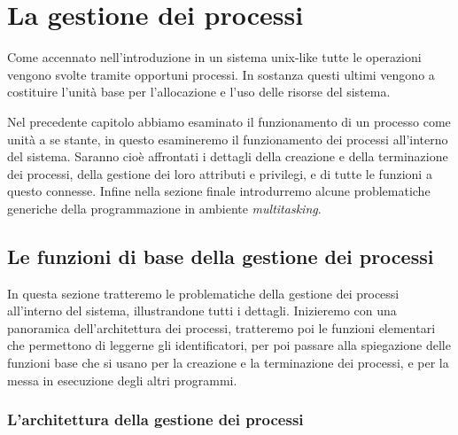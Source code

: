 
\chapter{La gestione dei processi}
\label{cha:process_handling}

Come accennato nell'introduzione in un sistema unix-like tutte le operazioni
vengono svolte tramite opportuni processi.  In sostanza questi ultimi vengono
a costituire l'unità base per l'allocazione e l'uso delle risorse del sistema.

Nel precedente capitolo abbiamo esaminato il funzionamento di un processo come
unità a se stante, in questo esamineremo il funzionamento dei processi
all'interno del sistema. Saranno cioè affrontati i dettagli della creazione e
della terminazione dei processi, della gestione dei loro attributi e
privilegi, e di tutte le funzioni a questo connesse. Infine nella sezione
finale introdurremo alcune problematiche generiche della programmazione in
ambiente \textit{multitasking}.


\section{Le funzioni di base della gestione dei processi}
\label{sec:proc_handling}

In questa sezione tratteremo le problematiche della gestione dei processi
all'interno del sistema, illustrandone tutti i dettagli.  Inizieremo con una
panoramica dell'architettura dei processi, tratteremo poi le funzioni
elementari che permettono di leggerne gli identificatori, per poi passare alla
spiegazione delle funzioni base che si usano per la creazione e la
terminazione dei processi, e per la messa in esecuzione degli altri programmi.


\subsection{L'architettura della gestione dei processi}
\label{sec:proc_hierarchy}

